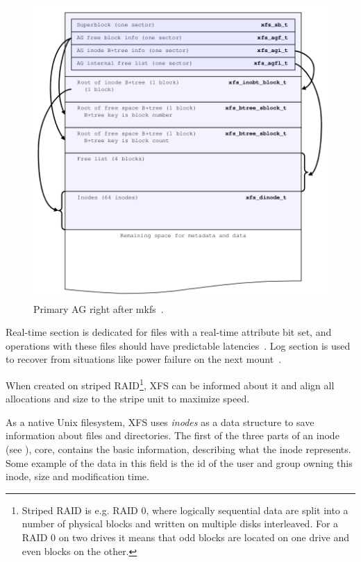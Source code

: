 \begin{figure}
  \centering
 \includegraphics[width=13cm,keepaspectratio]{fig/primary-ag} %
 \caption{Primary AG right after mkfs~\cite[Ch. 3]{xfsStructure}.}
\label{fig:xfs:primaryAG}
\end{figure}
	
Real-time section is dedicated for files with a real-time attribute bit set, and operations with these files should have predictable latencies~\cite{xfsRealtime}. Log section is used to recover from situations like power failure on the next mount~\cite{xfsStructure,xfsman}.

When created on striped RAID\footnote{Striped RAID is e.g. RAID 0, where logically sequential data are split into a number of physical blocks and written on multiple disks interleaved. For a RAID 0 on two drives it means that odd blocks are located on one drive and even blocks on the other.}, XFS can be informed about it and align all allocations and size to the stripe unit to maximize speed.

As a native Unix filesystem, XFS uses {\em inodes} as a data structure to save information about files and directories. The first of the three parts of an inode (see ), core, contains the basic information, describing what the inode represents. Some example of the data in this field is the id of the user and group owning this inode, size and modification time.

